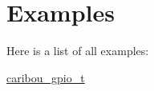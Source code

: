 \section{Examples}
Here is a list of all examples\-:\begin{DoxyCompactItemize}
\item 
\hyperlink{caribou_gpio_t-example}{caribou\-\_\-gpio\-\_\-t}
\end{DoxyCompactItemize}
